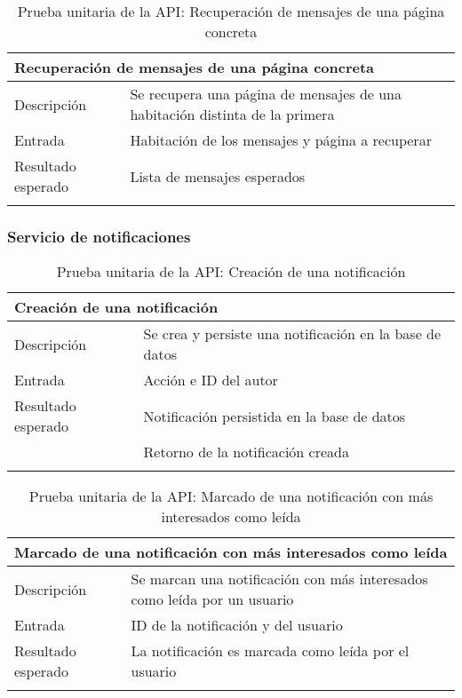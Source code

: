 \begin{longtable}{|p{} p{}|}
    \hline
    \multicolumn{2}{|l|}{\textbf{Recuperación de mensajes de una página concreta}} \\ \hline 
    Descripción                 & Se recupera una página de mensajes de una habitación distinta de la primera \\ \hline
    Entrada                     & Habitación de los mensajes y página a recuperar \\ \hline
    Resultado esperado          & Lista de mensajes esperados \\ \hline
    \caption{Prueba unitaria de la API: Recuperación de mensajes de una página concreta}
    \label{cp:u:api:recuperar_mensaje_pagina}
\end{longtable}

\subsubsection{Servicio de notificaciones}

\begin{longtable}{|p{} p{}|}
    \hline
    \multicolumn{2}{|l|}{\textbf{Creación de una notificación}} \\ \hline 
    Descripción                 & Se crea y persiste una notificación en la base de datos \\ \hline
    Entrada                     & Acción e ID del autor \\ \hline
    Resultado esperado          & Notificación persistida en la base de datos \\
                                & Retorno de la notificación creada \\ \hline
    \caption{Prueba unitaria de la API: Creación de una notificación}
    \label{cp:u:api:crear_notificacion}
\end{longtable}

\begin{longtable}{|p{} p{}|}
    \hline
    \multicolumn{2}{|l|}{\textbf{Marcado de una notificación con más interesados como leída}} \\ \hline 
    Descripción                 & Se marcan una notificación con más interesados como leída por un usuario \\ \hline
    Entrada                     & ID de la notificación y del usuario \\ \hline
    Resultado esperado          & La notificación es marcada como leída por el usuario \\ \hline
    \caption{Prueba unitaria de la API: Marcado de una notificación con más interesados como leída}
    \label{cp:u:api:marcar_notificacion_leida}
\end{longtable}

